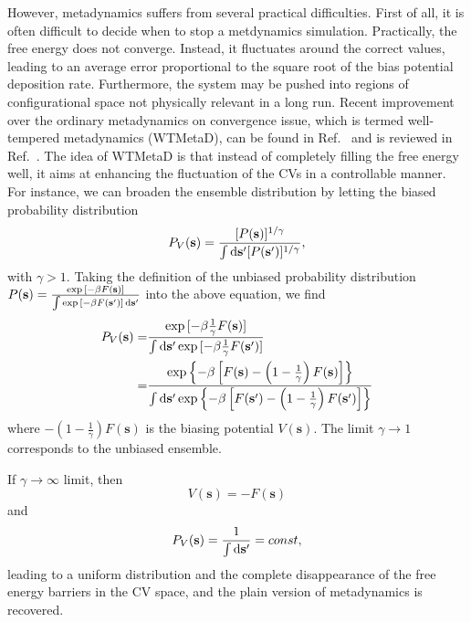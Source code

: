 However, metadynamics suffers from several practical difficulties. First of all, it is often difficult to decide when to stop a metdynamics simulation. Practically, the free energy does not converge. Instead, it fluctuates around the correct values, leading to an average error proportional to the square root of the bias potential deposition rate. Furthermore, the system may be pushed into regions of configurational space not physically relevant in a long run. Recent improvement over the ordinary metadynamics on convergence issue, which is termed well-tempered metadynamics (WTMetaD), can be found in Ref.~\cite{BarducciPRL2008} and is reviewed in Ref.~\cite{ValssonARPC2016}. The idea of WTMetaD is that instead of completely filling the free energy well, it aims at enhancing the fluctuation of the CVs in a controllable manner. For instance, we can broaden the ensemble distribution by letting the biased probability distribution
\begin{equation}
	P_V(\mathbf{s})=\frac{[P(\mathbf{s})]^{1/\gamma}}{\int \mathop{}\!\mathrm{d} \mathbf{s}^\prime[P(\mathbf{s}^\prime)]^{1/\gamma}},
	\label{Eq:ES:metadynamics:PvP}
\end{equation}
with $\gamma >1$. Taking the definition of the unbiased probability distribution $P(\mathbf{s})=\frac{\exp{[-\beta F(\mathbf{s})]}}{\int \exp{[-\beta F(\mathbf{s}^\prime)]} \mathop{}\!\mathrm{d}\mathbf{s}^\prime}$ into the above equation, we find
\begin{align}
	P_V(\mathbf{s})=&\frac{\exp{[-\beta \frac{1}{\gamma}F(\mathbf{s})]}}{\int\mathop{}\!\mathrm{d} \mathbf{s}^\prime \exp{[-\beta \frac{1}{\gamma}F(\mathbf{s}^\prime)]}}\notag\\
	               =&\frac{\exp{\left\{-\beta \left[F(\mathbf{s})-\left(1-\frac{1}{\gamma}\right)F(\mathbf{s})\right]\right\}}}{\int\mathop{}\!\mathrm{d} \mathbf{s}^\prime \exp{\left\{-\beta \left[F(\mathbf{s}^\prime)-\left(1-\frac{1}{\gamma}\right)F(\mathbf{s}^\prime)\right]\right\}}}
\end{align}
where
$-\left(1-\frac{1}{\gamma}\right)F(\mathbf{s})$ is the biasing potential $V(\mathbf{s})$. The limit $\gamma \to 1$ corresponds to the unbiased ensemble.

If $\gamma \to \infty$ limit, then
\begin{equation}
	V(\mathbf{s})=-F(\mathbf{s})
\end{equation}
and
\begin{equation}
	P_V(\mathbf{s})=\frac{1}{\int \mathop{}\!\mathrm{d} \mathbf{s}^\prime}=const,
\end{equation}
leading to a uniform distribution and the complete disappearance of the free energy barriers in the CV space, and the plain version of metadynamics is recovered.

